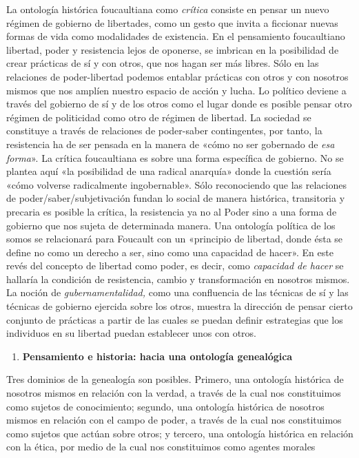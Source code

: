 La ontología histórica foucaultiana como \emph{crítica} consiste en pensar un nuevo régimen de gobierno de libertades, como un gesto que invita a ficcionar nuevas formas de vida como modalidades de existencia. En el pensamiento foucaultiano libertad, poder y resistencia lejos de oponerse, se imbrican en la posibilidad de crear prácticas de sí y con otros, que nos hagan ser más libres. Sólo en las relaciones de poder-libertad podemos entablar prácticas con otros y con nosotros mismos que nos amplíen nuestro espacio de acción y lucha. Lo político deviene a través del gobierno de sí y de los otros como el lugar donde es posible pensar otro régimen de politicidad como otro de régimen de libertad. La sociedad se constituye a través de relaciones de poder-saber contingentes, por tanto, la resistencia ha de ser pensada en la manera de «cómo no ser gobernado de \emph{esa forma}». La crítica foucaultiana es sobre una forma específica de gobierno. No se plantea aquí «la posibilidad de una radical anarquía» donde la cuestión sería «cómo volverse radicalmente ingobernable». Sólo reconociendo que las relaciones de poder/saber/subjetivación fundan lo social de manera histórica, transitoria y precaria es posible la crítica, la resistencia ya no al Poder sino a una forma de gobierno que nos sujeta de determinada manera. Una ontología política de los somos se relacionará para Foucault con un «principio de libertad, donde ésta se define no como un derecho a ser, sino como una capacidad de hacer». En este revés del concepto de libertad como poder, es decir, como \emph{capacidad de hacer} se hallaría la condición de resistencia, cambio y transformación en nosotros mismos. La noción de \emph{gubernamentalidad,} como una confluencia de las técnicas de sí y las técnicas de gobierno ejercida sobre los otros, muestra la dirección de pensar cierto conjunto de prácticas a partir de las cuales se puedan definir estrategias que los individuos en su libertad puedan establecer unos con otros.

\begin{enumerate}
\def\labelenumi{\arabic{enumi}.}
\item
  \textbf{Pensamiento e historia: hacia una ontología genealógica}
\end{enumerate}

Tres dominios de la genealogía son posibles. Primero, una ontología histórica de nosotros mismos en relación con la verdad, a través de la cual nos constituimos como sujetos de conocimiento; segundo, una ontología histórica de nosotros mismos en relación con el campo de poder, a través de la cual nos constituimos como sujetos que actúan sobre otros; y tercero, una ontología histórica en relación con la ética, por medio de la cual nos constituimos como agentes morales

